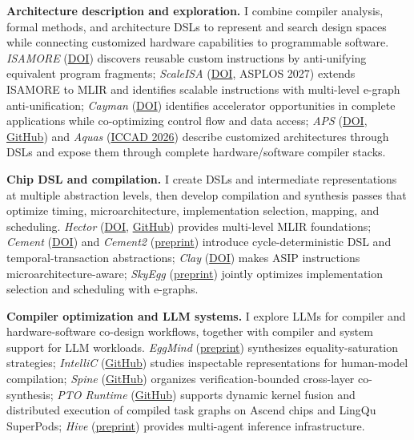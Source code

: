 \documentclass[letterpaper,11pt]{article} %
\newcommand{\ProjectLink}[2]{\href{#1}{#2}}
\newcommand{\ResearchParagraphTitle}[1]{\textcolor{StoryBlue}{\bfseries #1}}
\begin{document}
\smallskip
\noindent \ResearchParagraphTitle{Architecture description and exploration.} I combine compiler analysis, formal methods, and architecture DSLs to represent and search design spaces while connecting customized hardware capabilities to programmable software. \textit{ISAMORE} (\ProjectLink{https://doi.org/10.1145/3779212.3790162}{DOI}) discovers reusable custom instructions by anti-unifying equivalent program fragments; \textit{ScaleISA} (\ProjectLink{https://doi.org/10.1145/3845814.3850048}{DOI}, ASPLOS 2027) extends ISAMORE to MLIR and identifies scalable instructions with multi-level e-graph anti-unification; \textit{Cayman} (\ProjectLink{https://doi.org/10.1109/DAC63849.2025.11132875}{DOI}) identifies accelerator opportunities in complete applications while co-optimizing control flow and data access; \textit{APS} (\ProjectLink{https://doi.org/10.1109/ICCAD66269.2025.11240817}{DOI}, \ProjectLink{https://github.com/pku-liang/APS}{GitHub}) and \textit{Aquas} (\ProjectLink{https://uv-xiao.github.io/assets/pdf/aquas_iccad.pdf}{ICCAD 2026}) describe customized architectures through DSLs and expose them through complete hardware/software compiler stacks.

\smallskip
\noindent \ResearchParagraphTitle{Chip DSL and compilation.} I create DSLs and intermediate representations at multiple abstraction levels, then develop compilation and synthesis passes that optimize timing, microarchitecture, implementation selection, mapping, and scheduling. \textit{Hector} (\ProjectLink{https://doi.org/10.1145/3508352.3549370}{DOI}, \ProjectLink{https://github.com/pku-liang/Hector}{GitHub}) provides multi-level MLIR foundations; \textit{Cement} (\ProjectLink{https://doi.org/10.1145/3626202.3637561}{DOI}) and \textit{Cement2} (\ProjectLink{https://arxiv.org/abs/2511.15073}{preprint}) introduce cycle-deterministic DSL and temporal-transaction abstractions; \textit{Clay} (\ProjectLink{https://doi.org/10.1109/ICCAD66269.2025.11240669}{DOI}) makes ASIP instructions microarchitecture-aware; \textit{SkyEgg} (\ProjectLink{https://arxiv.org/abs/2511.15323}{preprint}) jointly optimizes implementation selection and scheduling with e-graphs.

\smallskip
\noindent \ResearchParagraphTitle{Compiler optimization and LLM systems.} I explore LLMs for compiler and hardware-software co-design workflows, together with compiler and system support for LLM workloads. \textit{EggMind} (\ProjectLink{https://arxiv.org/abs/2604.17364}{preprint}) synthesizes equality-saturation strategies; \textit{IntelliC} (\ProjectLink{https://github.com/uv-xiao/IntelliC}{GitHub}) studies inspectable representations for human-model compilation; \textit{Spine} (\ProjectLink{https://github.com/arch-of-shadow/spine}{GitHub}) organizes verification-bounded cross-layer co-synthesis; \textit{PTO Runtime} (\ProjectLink{https://github.com/hw-native-sys/simpler}{GitHub}) supports dynamic kernel fusion and distributed execution of compiled task graphs on Ascend chips and LingQu SuperPods; \textit{Hive} (\ProjectLink{https://arxiv.org/abs/2604.17353}{preprint}) provides multi-agent inference infrastructure.
\end{document}
